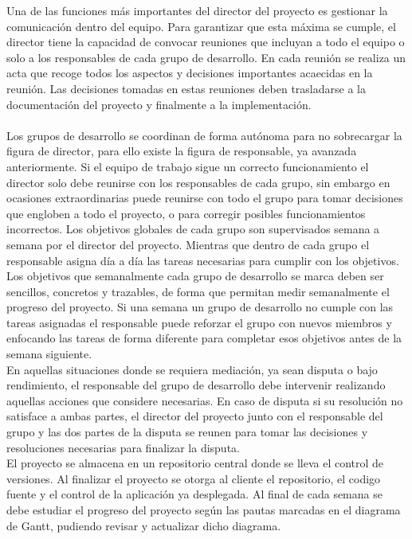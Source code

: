 Una de las funciones más importantes del director del proyecto es gestionar la comunicación dentro del equipo. Para garantizar que esta máxima se cumple, el director tiene la capacidad de convocar reuniones que incluyan a todo el equipo o solo a los responsables de cada grupo de desarrollo. En cada reunión se realiza un acta que recoge todos los aspectos y decisiones importantes acaecidas en la reunión. Las decisiones tomadas en estas reuniones deben trasladarse a la documentación del proyecto y finalmente a la implementación.
\\\\
Los grupos de desarrollo se coordinan de forma autónoma para no sobrecargar la figura de director, para ello existe la figura de responsable, ya avanzada anteriormente. Si el equipo de trabajo sigue un correcto funcionamiento el director solo debe reunirse con los responsables de cada grupo, sin embargo en ocasiones extraordinarias puede reunirse con todo el grupo para tomar decisiones que engloben a todo el proyecto, o para corregir posibles funcionamientos incorrectos. Los objetivos globales de cada grupo son supervisados semana a semana por el director del proyecto. Mientras que dentro de cada grupo el responsable asigna día a día las tareas necesarias para cumplir con los objetivos. Los objetivos que semanalmente cada grupo de desarrollo se marca deben ser sencillos, concretos y trazables, de forma que permitan  medir semanalmente el progreso del proyecto. Si una semana un grupo de desarrollo no cumple con las tareas asignadas el responsable puede reforzar el grupo con nuevos miembros y enfocando las tareas de forma diferente para completar esos objetivos antes de la semana siguiente.\\

En aquellas situaciones donde se requiera mediación, ya sean disputa o bajo rendimiento, el responsable del grupo de desarrollo debe intervenir realizando aquellas acciones que considere necesarias. En caso de disputa si su resolución no satisface a ambas partes, el director del proyecto junto con el responsable del grupo y las dos partes de la disputa se reunen para tomar las decisiones y resoluciones necesarias para finalizar la disputa.\\

El proyecto se almacena en un repositorio central donde se lleva el control de versiones. Al finalizar el proyecto se otorga al cliente el repositorio, el codigo fuente y el control de la aplicación ya desplegada. Al final de cada semana se debe estudiar el progreso del proyecto según las pautas marcadas en el diagrama de Gantt, pudiendo revisar y actualizar dicho diagrama.

